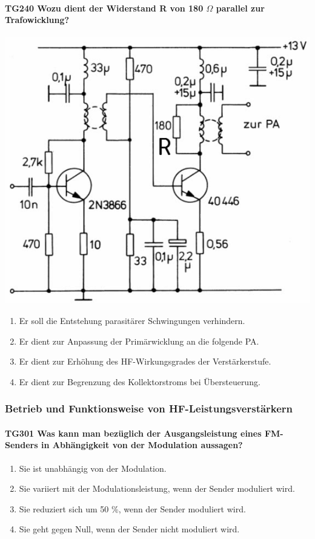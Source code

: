 \documentclass[8pt]{article}
\begin{document}
\paragraph*{TG240 Wozu dient der Widerstand R von 180 $\Omega$ parallel zur Trafowicklung?}
\begin{center}
	\begin{minipage}{\linewidth}
		\centering
		\includegraphics[scale=1.0]{pics/tg240_a.jpg}
	\end{minipage}
\end{center}
\begin{enumerate}[nolistsep,label=\Alph*]
\item Er soll die Entstehung parasitärer Schwingungen verhindern.
\item Er dient zur Anpassung der Primärwicklung an die folgende PA.
\item Er dient zur Erhöhung des HF-Wirkungsgrades der Verstärkerstufe.
\item Er dient zur Begrenzung des Kollektorstroms bei Übersteuerung.
\end{enumerate}

\pagebreak
\subsubsection{Betrieb und Funktionsweise von HF-Leistungsverstärkern}
\paragraph*{TG301 Was kann man bezüglich der Ausgangsleistung eines FM-Senders in Abhängigkeit von der Modulation aussagen?}
\begin{enumerate}[nolistsep,label=\Alph*]
\item Sie ist unabhängig von der Modulation.
\item Sie variiert mit der Modulationsleistung, wenn der Sender moduliert wird.
\item Sie reduziert sich um 50 \%, wenn der Sender moduliert wird.
\item Sie geht gegen Null, wenn der Sender nicht moduliert wird.
\end{enumerate}
\end{document}
